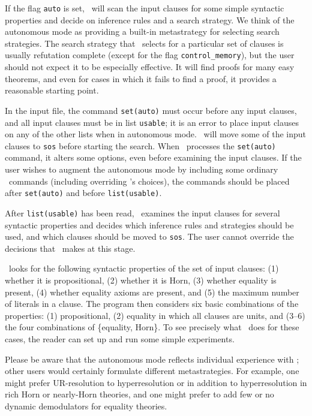 \documentclass[11pt]{article}
\begin{document}
If the flag \verb:auto: is set, \otter\ will scan the input
clauses for some simple syntactic properties and decide on inference
rules and a search strategy.  We think of the autonomous mode as
providing a built-in metastrategy for selecting search strategies.
The search strategy that \otter\ selects for a particular set of
clauses is usually refutation complete (except for the flag
\verb:control_memory:), but the user should not expect it to be
especially effective.  It will find proofs for many easy theorems, and
even for cases in which it fails to find a proof, it provides a
reasonable starting point.

In the input file, the command \verb:set(auto): must occur before
any input clauses, and all input clauses must be in list
\verb:usable:; it is an error to place input clauses on any of the
other lists when in autonomous mode.  \otter\ will move some of the
input clauses to \verb:sos: before starting the search.  When \otter\
processes the \verb:set(auto): command, it alters some options,
even before examining the input clauses.  If the user wishes to
augment the autonomous mode by including some ordinary \otter\ commands
(including overriding \otter's choices), the commands should be placed after
\verb:set(auto): and before \verb:list(usable):.

After \verb:list(usable): has been read, \otter\ examines the input
clauses for several syntactic properties and decides which inference
rules and strategies should be used, and which clauses should be moved
to \verb:sos:.  The user cannot override the decisions that \otter\
makes at this stage.

\otter\ looks for the following syntactic properties of the set of
input clauses:
(1) whether it is propositional,
(2) whether it is Horn,
(3) whether equality is present,
(4) whether equality axioms are present, and
(5) the maximum number of literals in a clause.
The program then considers six basic combinations of the properties:
(1) propositional,
(2) equality in which all clauses are units, and
(3--6) the four combinations of \{equality, Horn\}.
To see precisely what \otter\ does for these cases, the 
reader can set up and run some simple experiments.

Please be aware that the autonomous mode reflects
individual experience with \otter; other users would certainly formulate
different metastrategies.  For example, one might prefer UR-resolution
to hyperresolution or in addition to hyperresolution in rich Horn or
nearly-Horn theories, and one might prefer to add few or no dynamic
demodulators for equality theories.
\end{document}
